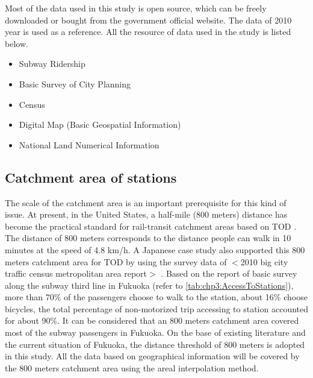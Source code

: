 %
Most of the data used in this study is open source, which can be freely downloaded or bought from the government official website. The data of 2010 year is used as a reference. All the resource of data used in the study is listed below.

%
\begin{itemize}
	\setlength{\parskip}{0\baselineskip} %
	\item Subway Ridership
	\item Basic Survey of City Planning
	\item Census
	\item Digital Map (Basic Geospatial Information)
	\item National Land Numerical Information
	\setlength{\parskip}{0.7\baselineskip} %
\end{itemize}

%
\subsection{Catchment area of stations}
%
The scale of the catchment area is an important prerequisite for this kind of issue. At present, in the United States, a half-mile (800 meters) distance has become the practical standard for rail-transit catchment areas based on TOD \cite{guerra2013half}. The distance of 800 meters corresponds to the distance people can walk in 10 minutes at the speed of 4.8 km/h. A Japanese case study also supported this 800 meters catchment area for TOD by using the survey data of $<$2010 big city traffic census metropolitan area report$>$ \cite{tadakatsu2015empirical}. Based on the report of basic survey along the subway third line in Fukuoka (refer to \ref{tab:chp3:AccessToStations}), more than 70\% of the passengers choose to walk to the station, about 16\% choose bicycles, the total percentage of non-motorized trip accessing to station accounted for about 90\%. It can be considered that an 800 meters catchment area covered most of the subway passengers in Fukuoka. On the base of existing literature and the current situation of Fukuoka, the distance threshold of 800 meters is adopted in this study. All the data based on geographical information will be covered by the 800 meters catchment area using the areal interpolation method.

